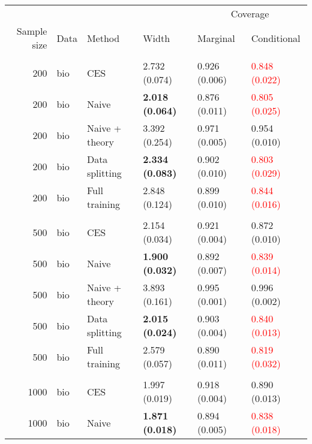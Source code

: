 
\begin{tabular}[t]{rlllll}
\toprule
\multicolumn{4}{c}{ } & \multicolumn{2}{c}{Coverage} \\
\cmidrule(l{3pt}r{3pt}){5-6}
Sample size & Data & Method & Width & Marginal & Conditional\\
\midrule
\addlinespace[0.3em]
\multicolumn{6}{l}{\textbf{200}}\\
\hspace{1em}200 & bio & CES & 2.732 (0.074) & 0.926 (0.006) & \textcolor{red}{0.848 (0.022)}\\
\hspace{1em}200 & bio & Naive & \textbf{2.018 (0.064)} & 0.876 (0.011) & \textcolor{red}{0.805 (0.025)}\\
\hspace{1em}200 & bio & Naive + theory & 3.392 (0.254) & 0.971 (0.005) & 0.954 (0.010)\\
\hspace{1em}200 & bio & Data splitting & \textbf{2.334 (0.083)} & 0.902 (0.010) & \textcolor{red}{0.803 (0.029)}\\
\hspace{1em}200 & bio & Full training & 2.848 (0.124) & 0.899 (0.010) & \textcolor{red}{0.844 (0.016)}\\
\addlinespace[0.3em]
\multicolumn{6}{l}{\textbf{500}}\\
\hspace{1em}500 & bio & CES & 2.154 (0.034) & 0.921 (0.004) & 0.872 (0.010)\\
\hspace{1em}500 & bio & Naive & \textbf{1.900 (0.032)} & 0.892 (0.007) & \textcolor{red}{0.839 (0.014)}\\
\hspace{1em}500 & bio & Naive + theory & 3.893 (0.161) & 0.995 (0.001) & 0.996 (0.002)\\
\hspace{1em}500 & bio & Data splitting & \textbf{2.015 (0.024)} & 0.903 (0.004) & \textcolor{red}{0.840 (0.013)}\\
\hspace{1em}500 & bio & Full training & 2.579 (0.057) & 0.890 (0.011) & \textcolor{red}{0.819 (0.032)}\\
\addlinespace[0.3em]
\multicolumn{6}{l}{\textbf{1000}}\\
\hspace{1em}1000 & bio & CES & 1.997 (0.019) & 0.918 (0.004) & 0.890 (0.013)\\
\hspace{1em}1000 & bio & Naive & \textbf{1.871 (0.018)} & 0.894 (0.005) & \textcolor{red}{0.838 (0.018)}\\

\end{tabular}
